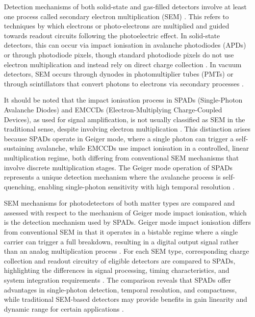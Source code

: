 \documentclass[12pt,a4paper,oneside]{report}
\begin{document}
Detection mechanisms of both solid-state and gas-filled detectors involve at least one process called secondary electron multiplication (SEM) \cite{bass2010}. This refers to techniques by which electrons or photo-electrons are multiplied and guided towards readout circuits following the photoelectric effect. In solid-state detectors, this can occur via impact ionisation in avalanche photodiodes (APDs) or through photodiode pixels, though standard photodiode pixels do not use electron multiplication and instead rely on direct charge collection \cite{bass2010}. In vacuum detectors, SEM occurs through dynodes in photomultiplier tubes (PMTs) or through scintillators that convert photons to electrons via secondary processes \cite{kolanoski2020}.

It should be noted that the impact ionisation process in SPADs (Single-Photon Avalanche Diodes) and EMCCDs (Electron-Multiplying Charge-Coupled Devices), as used for signal amplification, is not usually classified as SEM in the traditional sense, despite involving electron multiplication \cite{piron2020}. This distinction arises because SPADs operate in Geiger mode, where a single photon can trigger a self-sustaining avalanche, while EMCCDs use impact ionisation in a controlled, linear multiplication regime, both differing from conventional SEM mechanisms that involve discrete multiplication stages. The Geiger mode operation of SPADs represents a unique detection mechanism where the avalanche process is self-quenching, enabling single-photon sensitivity with high temporal resolution \cite{piron2020}.

SEM mechanisms for photodetectors of both matter types are compared and assessed with respect to the mechanism of Geiger mode impact ionisation, which is the detection mechanism used by SPADs. Geiger mode impact ionisation differs from conventional SEM in that it operates in a bistable regime where a single carrier can trigger a full breakdown, resulting in a digital output signal rather than an analog multiplication process \cite{piron2020}. For each SEM type, corresponding charge collection and readout circuitry of eligible detectors are compared to SPADs, highlighting the differences in signal processing, timing characteristics, and system integration requirements \cite{bass2010,piron2020}. The comparison reveals that SPADs offer advantages in single-photon detection, temporal resolution, and compactness, while traditional SEM-based detectors may provide benefits in gain linearity and dynamic range for certain applications \cite{piron2020}.
\end{document}
